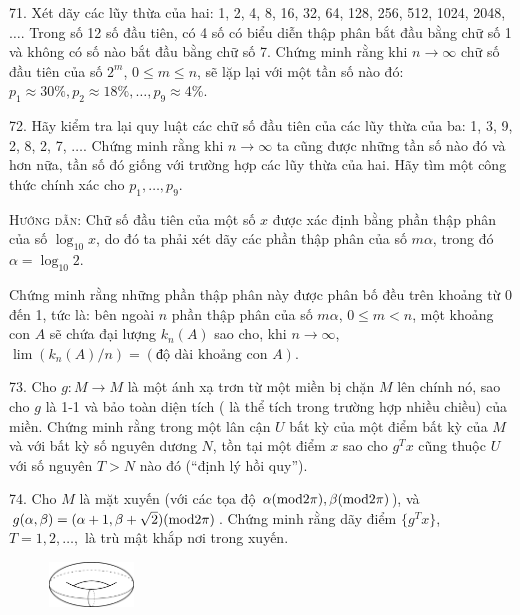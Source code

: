 \begin{problem}{71.}
	Xét dãy các lũy thừa của hai: 1, 2, 4, 8, 16, 32, 64, 128, 256, 512, 1024, 2048, $\ldots$. Trong số 12 số đầu tiên, có 4 số có biểu diễn thập phân bắt đầu bằng chữ số 1 và không có số nào bắt đầu bằng chữ số 7. Chứng minh rằng khi $n\rightarrow \infty$ chữ số đầu tiên của số $2^m$, $0\leq m\leq n$, sẽ lặp lại với một tần số nào đó: 
$p_1\approx 30\%, p_2\approx 18\%, \ldots, p_9 \approx 4\%$.
\end{problem}

\begin{problem}{72.}
	Hãy kiểm tra lại quy luật các chữ số đầu tiên của các lũy thừa của ba: 1, 3, 9, 2, 8, 2, 7, $\ldots$. Chứng minh rằng khi $n\rightarrow \infty$ ta cũng được những tần số nào đó và hơn nữa, tần số đó giống với trường hợp các lũy thừa của hai. Hãy tìm một công thức chính xác cho $p_1,\ldots, p_9$.

	\textsc{Hướng dẫn}: Chữ số đầu tiên của một số $x$ được xác định bằng phần thập phân của số $\log_{10}x$, do đó ta phải xét dãy các phần thập phân của số $m\alpha$, trong đó $\alpha=\log_{10}2$.

	Chứng minh rằng những phần thập phân này được phân bố đều trên khoảng từ 0 đến 1, tức là: bên ngoài $n$ phần thập phân của số $m\alpha$, $0\leq m<n$, một khoảng con $A$ sẽ chứa đại lượng $k_n(A)$ sao cho, khi $n\rightarrow \infty$, $\lim(k_n(A)/n)=(\mbox{độ dài khoảng con } A)$.
\end{problem}

\begin{problem}{73.}
	Cho $g: M\rightarrow M$ là một ánh xạ trơn từ một miền bị chặn $M$ lên chính nó, sao cho $g$ là 1-1 và bảo toàn diện tích ( là thể tích trong trường hợp nhiều chiều) của miền. Chứng minh rằng trong một lân cận $U$ bất kỳ của một điểm bất kỳ của $M$ và với bất kỳ số nguyên dương $N$, tồn tại một điểm $x$ sao cho $g^Tx$ cũng thuộc $U$ với số nguyên $T>N$ nào đó (\enquote{định lý hồi quy}).
\end{problem}

\begin{problem}{74.}
	Cho $M$ là mặt xuyến (với các tọa độ $\alpha({\rm mod} 2\pi), \beta({\rm mod} 2\pi)$), và $g(\alpha,\beta)=(\alpha+1,\beta+\sqrt{2})({\rm mod} 2\pi)$. Chứng minh rằng dãy điểm $\{g^Tx\}$, $T=1,2,\ldots,$ là trù mật khắp nơi trong xuyến.
	\begin{figure}
		\includegraphics[width=0.2\textwidth]{74_torus}
	\end{figure}
\end{problem}

